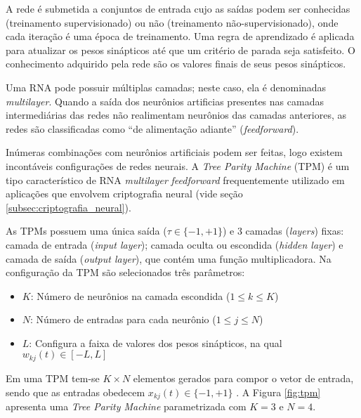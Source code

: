 \documentclass[12pt]{article}
\begin{document}
            A rede é submetida a conjuntos de entrada cujo as saídas podem ser conhecidas (treinamento supervisionado) ou não (treinamento não-supervisionado), onde cada iteração é uma época de treinamento. Uma regra de aprendizado é aplicada para atualizar os pesos sinápticos até que um critério de parada seja satisfeito. O conhecimento adquirido pela rede são os valores finais de seus pesos sinápticos.
            
            Uma RNA pode possuir múltiplas camadas; neste caso, ela é denominadas \textit{multilayer}. Quando a saída dos neurônios artificias presentes nas camadas intermediárias das redes não realimentam neurônios das camadas anteriores, as redes são classificadas como ``de alimentação adiante'' (\textit{feedforward}).
            
            Inúmeras combinações com neurônios artificiais podem ser feitas, logo existem incontáveis configurações de redes neurais. A \textit{Tree Parity Machine} (TPM) é um tipo característico de RNA \textit{multilayer} \textit{feedforward} frequentemente utilizado em aplicações que envolvem criptografia neural (vide seção \ref{subsec:criptografia_neural}).
            
            As TPMs possuem uma única saída ($\tau \in \{-1,+1\}$) e 3 camadas (\textit{layers}) fixas: camada de entrada (\textit{input layer}); camada oculta ou escondida  (\textit{hidden layer}) e camada de saída (\textit{output layer}), que contém uma função multiplicadora. Na configuração da TPM são selecionados três parâmetros: 
            \begin{itemize}
                \item $K$: Número de neurônios na camada escondida ($1 \leq k \leq K$)
                \item $N$: Número de entradas para cada neurônio ($1 \leq j \leq N$)
                \item $L$: Configura a faixa de valores dos pesos sinápticos, na qual $w_{kj}(t) \in [-L,L]$
            \end{itemize}
            Em uma TPM tem-se $K \times N$ elementos gerados para compor o vetor de entrada, sendo que as entradas obedecem $x_{kj}(t) \in \{-1,+1\}$ \cite{volkmer2005tree}. A Figura \ref{fig:tpm} apresenta uma \textit{Tree Parity Machine} parametrizada com $K = 3$ e $N = 4$.
            
            
            
\end{document}
